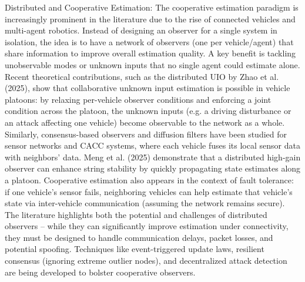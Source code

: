 Distributed and Cooperative Estimation: The cooperative estimation paradigm is increasingly prominent in the literature due to the rise of connected vehicles and multi-agent robotics. Instead of designing an observer for a single system in isolation, the idea is to have a network of observers (one per vehicle/agent) that share information to improve overall estimation quality. A key benefit is tackling unobservable modes or unknown inputs that no single agent could estimate alone. Recent theoretical contributions, such as the distributed UIO by Zhao et al. (2025), show that collaborative unknown input estimation is possible in vehicle platoons: by relaxing per-vehicle observer conditions and enforcing a joint condition across the platoon, the unknown inputs (e.g. a driving disturbance or an attack affecting one vehicle) become observable to the network as a whole. Similarly, consensus-based observers and diffusion filters have been studied for sensor networks and CACC systems, where each vehicle fuses its local sensor data with neighbors’ data. Meng et al. (2025) demonstrate that a distributed high-gain observer can enhance string stability by quickly propagating state estimates along a platoon. Cooperative estimation also appears in the context of fault tolerance: if one vehicle’s sensor fails, neighboring vehicles can help estimate that vehicle’s state via inter-vehicle communication (assuming the network remains secure). The literature highlights both the potential and challenges of distributed observers – while they can significantly improve estimation under connectivity, they must be designed to handle communication delays, packet losses, and potential spoofing. Techniques like event-triggered update laws, resilient consensus (ignoring extreme outlier nodes), and decentralized attack detection are being developed to bolster cooperative observers.

